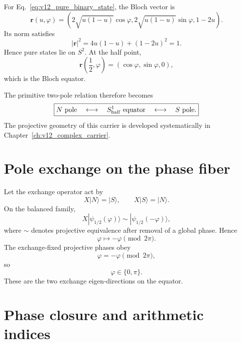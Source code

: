 For Eq.~\eqref{eq:v12_pure_binary_state}, the Bloch vector is
\begin{equation}
\mathbf r(u,\varphi)
=\left(
2\sqrt{u(1-u)}\cos\varphi,
2\sqrt{u(1-u)}\sin\varphi,
1-2u
\right).
\end{equation}
Its norm satisfies
\begin{equation}
|\mathbf r|^2
=4u(1-u)+(1-2u)^2
=1.
\end{equation}
Hence pure states lie on $S^2$. At the half point,
\begin{equation}
\boxed{
\mathbf r\left(\frac12,\varphi\right)
=(\cos\varphi,\sin\varphi,0),
}
\label{eq:v12_half_equator}
\end{equation}
which is the Bloch equator.

The primitive two-pole relation therefore becomes
\begin{equation}
\boxed{
N\text{ pole}
\quad\longleftrightarrow\quad
S^1_{\rm half}\text{ equator}
\quad\longleftrightarrow\quad
S\text{ pole}.
}
\end{equation}
The projective geometry of this carrier is developed systematically in Chapter~\ref{ch:v12_complex_carrier}.

\section{Pole exchange on the phase fiber}

Let the exchange operator act by
\begin{equation}
X|N\rangle=|S\rangle,
\qquad
X|S\rangle=|N\rangle.
\end{equation}
On the balanced family,
\begin{equation}
X|\psi_{1/2}(\varphi)\rangle
\sim
|\psi_{1/2}(-\varphi)\rangle,
\end{equation}
where $\sim$ denotes projective equivalence after removal of a global phase. Hence
\begin{equation}
\boxed{\varphi\mapsto-\varphi\pmod{2\pi}.}
\label{eq:v12_half_phase_exchange}
\end{equation}
The exchange-fixed projective phases obey
\begin{equation}
\varphi=-\varphi\pmod{2\pi},
\end{equation}
so
\begin{equation}
\boxed{\varphi\in\{0,\pi\}.}
\label{eq:v12_half_fixed_phases}
\end{equation}
These are the two exchange eigen-directions on the equator.

\section{Phase closure and arithmetic indices}

